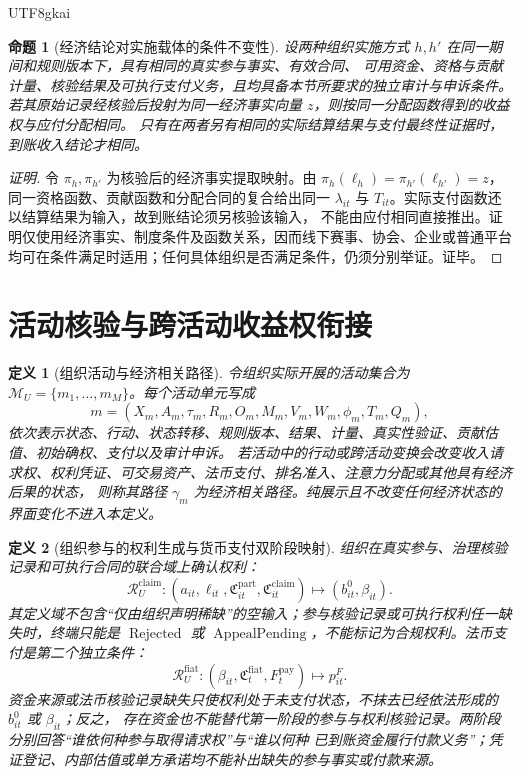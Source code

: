 \documentclass[12pt,a4paper,openany]{report}
\newtheorem{definition}{定义}[chapter]
\newtheorem{proposition}{命题}[chapter]
\begin{document}
\begin{CJK*}{UTF8}{gkai}
\begin{proposition}[经济结论对实施载体的条件不变性]
\label{prop:participation-carrier-independence}
设两种组织实施方式 \(h,h'\) 在同一期间和规则版本下，具有相同的真实参与事实、有效合同、
可用资金、资格与贡献计量、核验结果及可执行支付义务，且均具备本节所要求的独立审计与申诉条件。
若其原始记录经核验后投射为同一经济事实向量 \(z\)，则按同一分配函数得到的收益权与应付分配相同。
只有在两者另有相同的实际结算结果与支付最终性证据时，到账收入结论才相同。
\end{proposition}

\begin{proof}[证明]
令 \(\pi_h,\pi_{h'}\) 为核验后的经济事实提取映射。由
\(\pi_h(\ell_h)=\pi_{h'}(\ell_{h'})=z\)，同一资格函数、贡献函数和分配合同的复合给出同一
\(\lambda_{it}\) 与 \(T_{it}\)。实际支付函数还以结算结果为输入，故到账结论须另核验该输入，
不能由应付相同直接推出。证明仅使用经济事实、制度条件及函数关系，因而线下赛事、协会、企业或普通平台
均可在条件满足时适用；任何具体组织是否满足条件，仍须分别举证。证毕。
\end{proof}

\section{活动核验与跨活动收益权衔接}

\begin{definition}[组织活动与经济相关路径]
令组织实际开展的活动集合为 \(\mathcal M_U=\{m_1,\ldots,m_M\}\)。每个活动单元写成
\[
  m=(X_m,A_m,\tau_m,R_m,O_m,M_m,V_m,W_m,\phi_m,T_m,Q_m),
\]
依次表示状态、行动、状态转移、规则版本、结果、计量、真实性验证、贡献估值、初始确权、支付以及审计申诉。
若活动中的行动或跨活动变换会改变收入请求权、权利凭证、可交易资产、法币支付、排名准入、注意力分配或其他具有经济后果的状态，
则称其路径 \(\gamma_m\) 为经济相关路径。纯展示且不改变任何经济状态的界面变化不进入本定义。
\end{definition}

\begin{definition}[组织参与的权利生成与货币支付双阶段映射]
\label{def:activity-rights-map}
组织在真实参与、治理核验记录和可执行合同的联合域上确认权利：
\[
  \mathcal R_U^{\mathrm{claim}}:
  (a_{it},\ell_{it},\mathfrak C_{it}^{\mathrm{part}},
  \mathfrak C_{it}^{\mathrm{claim}})
  \longmapsto
  (b_{it}^{0},\beta_{it}).
\]
其定义域不包含“仅由组织声明稀缺”的空输入；参与核验记录或可执行权利任一缺失时，终端只能是
\(\operatorname{Rejected}\) 或 \(\operatorname{AppealPending}\)，不能标记为合规权利。法币支付是第二个独立条件：
\[
  \mathcal R_U^{\mathrm{fiat}}:
  (\beta_{it},\mathfrak C_t^{\mathrm{fiat}},F_t^{\mathrm{pay}})
  \longmapsto p_{it}^{F}.
\]
资金来源或法币核验记录缺失只使权利处于未支付状态，不抹去已经依法形成的 \(b_{it}^{0}\) 或 \(\beta_{it}\)；反之，
存在资金也不能替代第一阶段的参与与权利核验记录。两阶段分别回答“谁依何种参与取得请求权”与“谁以何种
已到账资金履行付款义务”；凭证登记、内部估值或单方承诺均不能补出缺失的参与事实或付款来源。
\end{definition}


\end{CJK*}
\end{document}
